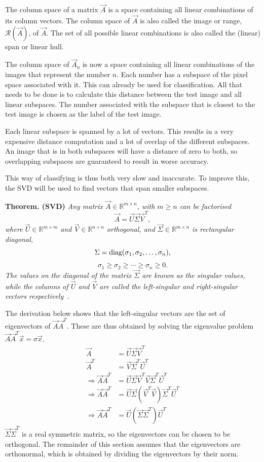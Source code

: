 The column space of a matrix \(\vec{A}\) is a space containing all linear combinations of its column vectors.
The column space of \(\vec{A}\) is also called the image or range, \(\mathcal{R}(\vec{A})\), of \(\vec{A}\).
The set of all possible linear combinations is also called the (linear) span or linear hull.

The column space of \(\vec{A}_n\) is now a space containing all linear combinations of the images that represent the number \(n\).
Each number has a subspace of the pixel space associated with it.
This can already be used for classification.
All that needs to be done is to calculate this distance between the test image and all linear subspaces. The number associated with the subspace that is closest to the test image is chosen as the label of the test image.

Each linear subspace is spanned by a lot of vectors.
This results in a very expensive distance computation and a lot of overlap of the different subspaces.
An image that is in both subspaces will have a distance of zero to both, so overlapping subspaces are guaranteed to result in worse accuracy.

This way of classifying is thus both very slow and inaccurate.
To improve this, the SVD will be used to find vectors that span smaller subspaces.

\textbf{Theorem. (SVD)} \textit{Any matrix \(\vec{A}\in \mathbb{R}^{m \times n}\), with \(m\geq n\) can be factorised
    \[\vec{A} = \vec{U}\vec{\Sigma}\vec{V}^T,\]
    where \(\vec{U}\in\mathbb{R}^{m\times m}\) and \(\vec{V}\in\mathbb{R}^{n\times n}\) orthogonal, and \(\vec{\Sigma}\in\mathbb{R}^{m\times n}\) is rectangular diagonal,
    \[\Sigma = \textnormal{diag}(\sigma_1, \sigma_2, \ldots, \sigma_n),\]
    \[\sigma_1\geq\sigma_2\geq\cdots\geq\sigma_n\geq 0.\]
    The values on the diagonal of the matrix \(\vec{\Sigma}\) are known as the singular values, while the columns of \(\vec{U}\) and \(\vec{V}\) are called the left-singular and right-singular vectors respectively~\cite{Elden2011, Savas2007}.}

The derivation below shows that the left-singular vectors are the set of eigenvectors of \(\vec{A}\vec{A}^T\).
These are thus obtained by solving the eigenvalue problem \(\vec{A}\vec{A}^T\vec{x} = \sigma \vec{x}\).
\begin{align*}
    \vec{A}                      & = \vec{U}\vec{\Sigma}\vec{V}^T                                 \\
    \vec{A}^T                    & = \vec{V}\vec{\Sigma}^T\vec{U}^T                               \\
    \Rightarrow \vec{A}\vec{A}^T & = \vec{U}\vec{\Sigma}\vec{V}^T\vec{V}\vec{\Sigma}^T\vec{U}^T   \\
    \Rightarrow \vec{A}\vec{A}^T & = \vec{U}\vec{\Sigma}(\vec{V}^T\vec{V})\vec{\Sigma}^T\vec{U}^T \\
    \Rightarrow \vec{A}\vec{A}^T & = \vec{U}(\vec{\Sigma}\vec{\Sigma}^T)\vec{U}^T
\end{align*}
\(\vec{\Sigma}\vec{\Sigma}^T\) is a real symmetric matrix, so the eigenvectors can be chosen to be orthogonal.
The remainder of this section assumes that the eigenvectors are orthonormal, which is obtained by dividing the eigenvectors by their norm.

